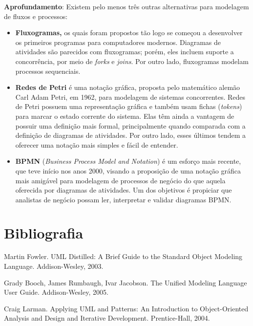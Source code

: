 \documentclass[
  11pt,
  twoside]{book}
\newenvironment{esmbox}{\centering \vspace{1.5ex} \begin{tcolorbox}[breakable, colback=backcolor, width=4.9in]}{\end{tcolorbox} \vspace{1.5ex}}
\begin{document}
\begin{esmbox}

\textbf{Aprofundamento}: Existem pelo menos três outras alternativas
para modelagem de fluxos e processos:

\begin{itemize}
\item
  \textbf{Fluxogramas,}  os quais foram propostos tão
  logo se começou a desenvolver os primeiros programas para computadores
  modernos. Diagramas de atividades são parecidos com fluxogramas;
  porém, eles incluem suporte a concorrência, por meio de \emph{forks} e
  \emph{joins}. Por outro lado, fluxogramas modelam processos
  sequenciais.
\item
  \textbf{Redes de Petri}  é uma notação gráfica,
  proposta pelo matemático alemão Carl Adam Petri, em 1962, para
  modelagem de sistemas concorrentes. Redes de Petri possuem uma
  representação gráfica e também usam fichas (\emph{tokens}) para marcar
  o estado corrente do sistema. Elas têm ainda a vantagem de possuir uma
  definição mais formal, principalmente quando comparada com a definição
  de diagramas de atividades. Por outro lado, esses últimos tendem a
  oferecer uma notação mais simples e fácil de entender.
\item
  \textbf{BPMN} (\emph{Business Process Model and Notation})
   é um esforço mais
  recente, que teve início nos anos 2000, visando a proposição de uma
  notação gráfica mais amigável para modelagem de processos de negócio
  do que aquela oferecida por diagramas de atividades. Um dos objetivos
  é propiciar que analistas de negócio possam ler, interpretar e validar
  diagramas BPMN.
\end{itemize}

\end{esmbox}

\hypertarget{bibliografia-3}{%
\section*{Bibliografia}\label{bibliografia-3}}

Martin Fowler. UML Distilled: A Brief Guide to the Standard Object
Modeling Language. Addison-Wesley, 2003.

Grady Booch, James Rumbaugh, Ivar Jacobson. The Unified Modeling
Language User Guide. Addison-Wesley, 2005.

Craig Larman. Applying UML and Patterns: An Introduction to
Object-Oriented Analysis and Design and Iterative Development.
Prentice-Hall, 2004.
\end{document}
